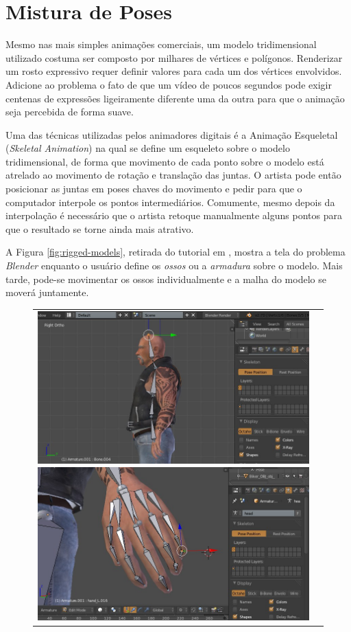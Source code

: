 {\section{Mistura de Poses}

  Mesmo nas mais simples animações comerciais, um modelo tridimensional
utilizado costuma ser composto por milhares de vértices e polígonos.
Renderizar um rosto expressivo requer definir valores para cada um dos
vértices envolvidos. Adicione ao problema o fato de que um vídeo de poucos
segundos pode exigir centenas de expressões ligeiramente diferente uma da
outra para que o animação seja percebida de forma suave.
    
  Uma das técnicas utilizadas pelos animadores digitais é a Animação
Esqueletal (\textit{Skeletal Animation}) na qual se define um esqueleto
sobre o modelo tridimensional, de forma que movimento de cada ponto sobre o
modelo está atrelado ao movimento de rotação e translação das juntas. O
artista pode então posicionar as juntas em poses chaves do movimento e pedir
para que o computador interpole os pontos intermediários. Comumente, mesmo
depois da interpolação é necessário que o artista retoque manualmente alguns
pontos para que o resultado se torne ainda mais atrativo.
    
    A Figura \ref{fig:rigged-models}, retirada do tutorial em \cite{rigs-tutorial}, mostra a tela do problema \textit{Blender} enquanto o usuário define os \textit{ossos} ou a \textit{armadura} sobre o modelo. Mais tarde, pode-se movimentar os ossos individualmente e a malha do modelo se moverá juntamente.
    
    
\begin{figure}[!htb]
   \centering
\begin{tabular}{cc}
  \includegraphics[width=0.4\linewidth]{./figs/blender_armature_image.jpg}
  \includegraphics[width=0.4\linewidth]{./figs/blender_armature_image_14.jpg}
\end{tabular}


\end{figure}}
